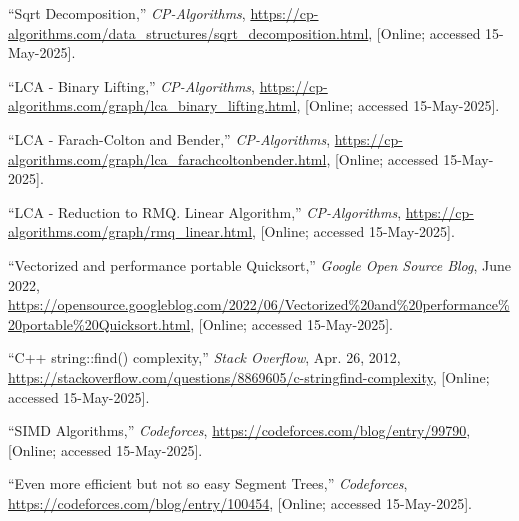 \documentclass[12pt]{article}
\begin{document}
\begin{thebibliography}{50}
  ``Sqrt Decomposition,''
  \emph{CP-Algorithms},
  \url{https://cp-algorithms.com/data_structures/sqrt_decomposition.html},
  [Online; accessed 15-May-2025].
  
  ``LCA - Binary Lifting,''
  \emph{CP-Algorithms},
  \url{https://cp-algorithms.com/graph/lca_binary_lifting.html},
  [Online; accessed 15-May-2025].
  
  ``LCA - Farach-Colton and Bender,''
  \emph{CP-Algorithms},
  \url{https://cp-algorithms.com/graph/lca_farachcoltonbender.html},
  [Online; accessed 15-May-2025].
  
  ``LCA - Reduction to RMQ. Linear Algorithm,''
  \emph{CP-Algorithms},
  \url{https://cp-algorithms.com/graph/rmq_linear.html},
  [Online; accessed 15-May-2025].

  ``Vectorized and performance portable Quicksort,''
  \emph{Google Open Source Blog}, June 2022,
  \url{https://opensource.googleblog.com/2022/06/Vectorized%20and%20performance%20portable%20Quicksort.html},
  [Online; accessed 15-May-2025].

  ``C++ string::find() complexity,''
  \emph{Stack Overflow}, Apr. 26, 2012,
  \url{https://stackoverflow.com/questions/8869605/c-stringfind-complexity},
  [Online; accessed 15-May-2025].

  
  ``SIMD Algorithms,''
  \emph{Codeforces},
  \url{https://codeforces.com/blog/entry/99790},
  [Online; accessed 15-May-2025].

  ``Even more efficient but not so easy Segment Trees,''
  \emph{Codeforces},
  \url{https://codeforces.com/blog/entry/100454},
  [Online; accessed 15-May-2025].
\end{thebibliography}
\end{document}
